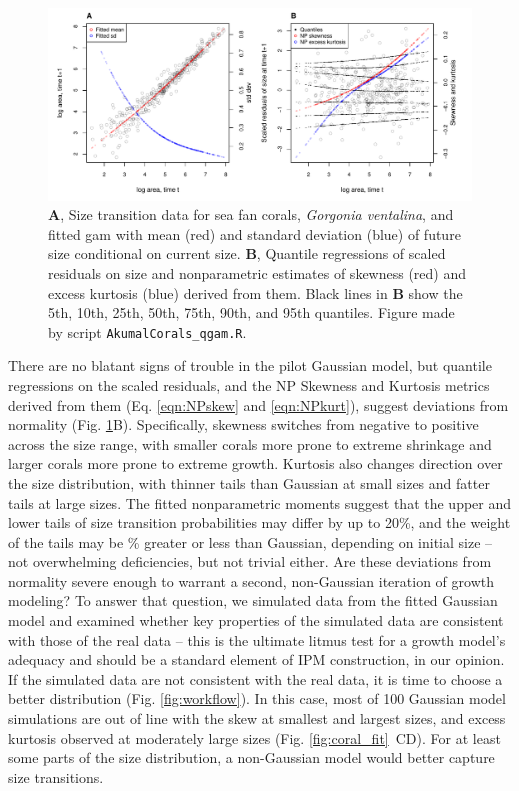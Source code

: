 \documentclass[12pt]{article}
\begin{document}
\begin{figure}[tbp]
	\centering
	\includegraphics[width=1.0\textwidth]{figures/coral_qgam_diagnostics.pdf}
	\caption{\textbf{A}, Size transition data for sea fan corals, \emph{Gorgonia ventalina}, and fitted gam with mean (red) and standard deviation (blue) of future size conditional on current size.  \textbf{B}, Quantile regressions of scaled residuals on size and nonparametric estimates of skewness (red) and excess kurtosis (blue) derived from them. Black lines in \textbf{B} show the 5th, 10th, 25th, 50th, 75th, 90th, and 95th quantiles. Figure made by script \texttt{AkumalCorals\_qgam.R}.}
	\label{fig:coral_diagnostics}
\end{figure} 

There are no blatant signs of trouble in the pilot Gaussian model, but quantile regressions on the scaled residuals, and the NP Skewness and Kurtosis metrics derived from them (Eq. \ref{eqn:NPskew} and \ref{eqn:NPkurt}), suggest deviations from normality (Fig. \ref{fig:coral_diagnostics}B).
Specifically, skewness switches from negative to positive across the size range, with smaller corals more prone to extreme shrinkage and larger corals more prone to extreme growth.  
Kurtosis also changes direction over the size distribution, with thinner tails than Gaussian at small sizes and fatter tails at large sizes. 
The fitted nonparametric moments suggest that the upper and lower tails of size transition probabilities may differ by up to 20\%, and the weight of the tails may be \% greater or less than Gaussian, depending on initial size -- not overwhelming deficiencies, but not trivial either. 
Are these deviations from normality severe enough to warrant a second, non-Gaussian iteration of growth modeling? 
To answer that question, we simulated data from the fitted Gaussian model and examined whether key properties of the simulated data are consistent with those of the real data -- this is the ultimate litmus test for a growth model's adequacy and should be a standard element of IPM construction, in our opinion.
If the simulated data are not consistent with the real data, it is time to choose a better distribution (Fig. \ref{fig:workflow}). 
In this case, most of 100 Gaussian model simulations are out of line with the skew at smallest and largest sizes, and excess kurtosis observed at moderately large sizes (Fig. \ref{fig:coral_fit}~CD). For at least some parts of the size distribution, a non-Gaussian model would better capture size transitions. 
\end{document}
